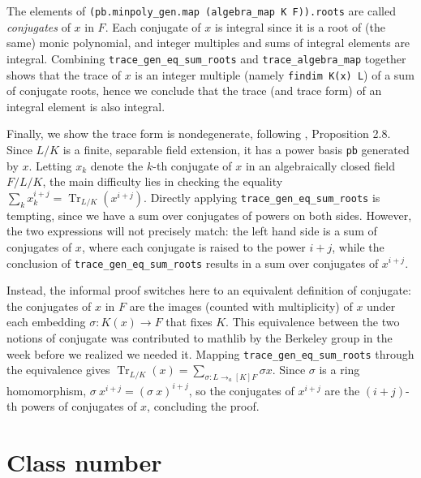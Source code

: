 \documentclass[a4paper,USenglish,cleveref, autoref, thm-restate]{lipics-v2021}
\newcommand{\lean}[1]{\texttt{#1}\xspace} %
\DeclareMathOperator{\Tr}{\mathrm{Tr}}
\newcommand{\mathlib}{\textsf{mathlib}\xspace}
\begin{document}
The elements of \lean{(pb.minpoly\_gen.map (algebra\_map K F)).roots} are called \emph{conjugates} of $x$ in $F$.
Each conjugate of $x$ is integral since it is a root of (the same) monic polynomial,
and integer multiples and sums of integral elements are integral.
Combining \lean{trace\_gen\_eq\_sum\_roots} and \lean{trace\_algebra\_map} together shows that the trace of $x$ is an integer multiple (namely \lean{findim K(x) L}) of a sum of conjugate roots, hence we conclude that the trace (and trace form) of an integral element is also integral.

Finally, we show the trace form is nondegenerate, following \cite{Neukirch}, Proposition 2.8.
Since $L / K$ is a finite, separable field extension, it has a power basis \lean{pb} generated by $x$.
Letting $x_k$ denote the $k$-th conjugate of $x$ in an algebraically closed field $F / L / K$,
the main difficulty lies in checking the equality $\sum_k x_k^{i + j} = \Tr_{L / K} (x^{i + j})$.
Directly applying \lean{trace\_gen\_eq\_sum\_roots} is tempting, since we have a sum over conjugates of powers on both sides.
However, the two expressions will not precisely match: the left hand side is a sum of conjugates of $x$, where each conjugate is raised to the power $i + j$,
while the conclusion of \lean{trace\_gen\_eq\_sum\_roots} results in a sum over conjugates of $x^{i + j}$.

Instead, the informal proof switches here to an equivalent definition of conjugate:
the conjugates of $x$ in $F$ are the images (counted with multiplicity) of $x$ under each embedding $\sigma \colon K(x) \to F$ that fixes $K$.
This equivalence between the two notions of conjugate was contributed to \mathlib by the Berkeley group in the week before we realized we needed it.
Mapping \lean{trace\_gen\_eq\_sum\_roots} through the equivalence gives
$\Tr_{L / K}(x) = \sum_{σ : L \to_a[K] F} \sigma x$.
Since $\sigma$ is a ring homomorphism, $\sigma\ x^{i + j} = (\sigma\ x)^{i + j}$,
so the conjugates of $x^{i + j}$ are the $(i + j)$-th powers of conjugates of $x$, concluding the proof.

\section{Class number} \label{sec:class-number}
\end{document}
